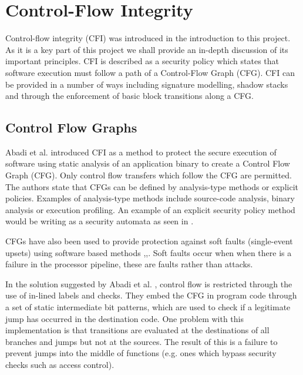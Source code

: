 \section{Control-Flow Integrity}

Control-flow integrity (CFI) was introduced in the introduction to this project. As it is a key part of this project we shall provide an in-depth discussion of its important principles. CFI is described as a security policy which states that software execution must follow a path of a Control-Flow Graph (CFG). CFI can be provided in a number of ways including signature modelling, shadow stacks and through the enforcement of basic block transitions along a CFG.

\subsection{Control Flow Graphs}
Abadi et al. \cite{Abadi2005} introduced CFI as a method to protect the secure execution of software using static analysis of an application binary to create a Control Flow Graph (CFG). Only control flow transfers which follow the CFG are permitted. The authors state that CFGs can be defined by analysis-type methods or explicit policies. Examples of analysis-type methods include source-code analysis, binary analysis or execution profiling. An example of an explicit security policy method would be writing as a security automata as seen in \cite{Erlingsson2004}. 

CFGs have also been used to provide protection against soft faults (single-event upsets) using software based methods \cite{Oh2002},\cite{Sharma2012},\cite{Venkatasubramanian2003}. Soft faults occur when when there is a failure in the processor pipeline, these are faults rather than attacks.

In the solution suggested by Abadi et al. \cite{Abadi2005}, control flow is restricted through the use of in-lined labels and checks. They embed the CFG in program code through a set of static intermediate bit patterns, which are used to check if a legitimate jump has occurred in the destination code. One problem with this implementation is that transitions are evaluated at the destinations of all branches and jumps but not at the sources. The result of this is a failure to prevent jumps into the middle of functions (e.g. ones which bypass security checks such as access control).

